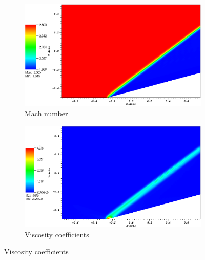 \documentclass[preprint,10pt]{elsarticle}
\begin{document}
\begin{figure}[H]
        \centering
        \begin{subfigure}[b]{0.52\textwidth}
                \centering
                \includegraphics[width=\textwidth]{CompressionCorner2D_mach.png}
                \caption{Mach number}
                \label{fig:2d_corner_mach}
        \end{subfigure}%

        \begin{subfigure}[b]{0.52\textwidth}
                \centering
                \includegraphics[width=\textwidth]{CompressionCorner2D_viscosity.png}
                \caption{Viscosity coefficients}
                \label{fig:2d_corner_visc}
        \end{subfigure}
        

\end{figure}
\end{document}
